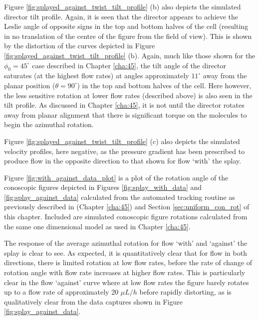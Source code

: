 Figure \ref{fig:splayed_against_twist_tilt_profile} (b) also depicts the simulated director tilt profile. Again, it is seen that the director appears to achieve the Leslie angle of opposite signs in the top and bottom halves of the cell (resulting in no translation of the centre of the figure from the field of view). This is shown by the distortion of the curves depicted in Figure \ref{fig:splayed_against_twist_tilt_profile} (b). Again, much like those shown for the $\phi_0=45^{\circ}$ case described in Chapter \ref{cha:45}, the tilt angle of the director saturates (at the highest flow rates) at angles approximately $11^{\circ}$ away from the planar position ($\theta=90^{\circ}$) in the top and bottom halves of the cell. Here however, the less sensitive rotation at lower flow rates (described above) is also seen in the tilt profile. As discussed in Chapter \ref{cha:45}, it is not until the director rotates away from planar alignment that there is significant torque on the molecules to begin the azimuthal rotation.

Figure \ref{fig:splayed_against_twist_tilt_profile} (c) also depicts the simulated velocity profiles, here negative, as the pressure gradient has been prescribed to produce flow in the opposite direction to that shown for flow `with' the splay.

Figure \ref{fig:with_against_data_plot} is a plot of the rotation angle of the conoscopic figures depicted in Figures \ref{fig:splay_with_data} and \ref{fig:splay_against_data} calculated from the automated tracking routine as previously described in (Chapter \ref{cha:45}) and Section \ref{sec:uniform_con_rot} of this chapter. Included are simulated conoscopic figure rotations calculated from the same one dimensional model as used in Chapter \ref{cha:45}.

The response of the average azimuthal rotation for flow `with' and `against' the splay is clear to see. As expected, it is quantitatively clear that for flow in both directions, there is limited rotation at low flow rates, before the rate of change of rotation angle with flow rate increases at higher flow rates. This is particularly clear in the flow `against' curve where at low flow rates the figure barely rotates up to a flow rate of approximately 20 $\mu L/h$ before rapidly distorting, as is qualitatively clear from the data captures shown in Figure \ref{fig:splay_against_data}.

